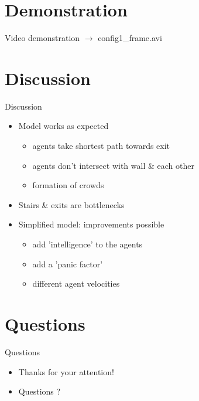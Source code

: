 \section{Demonstration}

\begin{frame}{Video demonstration}
$\rightarrow$ config1\_frame.avi
\end{frame}


\section{Discussion}

\begin{frame}{Discussion}
\begin{itemize}
	\item Model works as expected
		\begin{itemize}
			\item agents take shortest path towards exit
			\item agents don't intersect with wall \& each other
			\item formation of crowds
		\end{itemize}
	\item Stairs \& exits are bottlenecks
	\item Simplified model: improvements possible
		\begin{itemize}
			\item add 'intelligence' to the agents
			\item add a 'panic factor'
			\item different agent velocities
		\end{itemize}
\end{itemize}
\end{frame}


\section{Questions}

\begin{frame}{Questions}
	\begin{itemize}
		\item Thanks for your attention!
		\item Questions ?
	\end{itemize}
\end{frame}
